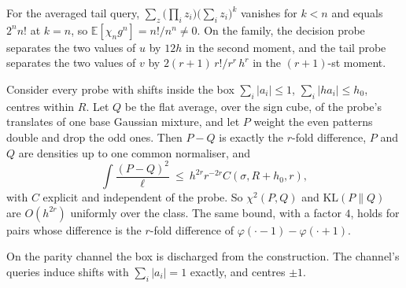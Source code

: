 \begin{theorem}[Attainment]
\label{thm:attain}
For the averaged tail query, $\sum_{z}\bigl(\prod_{i}z_{i}\bigr)\bigl(\sum_{i}z_{i}\bigr)^{k}$
vanishes for $k<n$ and equals $2^{n}n!$ at $k=n$, so $\mathbb{E}[\chi_{n}g^{n}]=n!/n^{n}\ne0$. On
the family, the decision probe separates the two values of $u$ by $12h$ in the second moment,
and the tail probe separates the two values of $v$ by $2(r+1)\,r!/r^{r}\,h^{r}$ in the
$(r+1)$-st moment.
\end{theorem}


\begin{theorem}
\label{thm:unif}
Consider every probe with shifts inside the box $\sum_{i}|a_{i}|\le1$, $\sum_{i}|ha_{i}|\le h_{0}$,
centres within $R$. Let $Q$ be the flat average, over the sign cube, of the probe's translates
of one base Gaussian mixture, and let $P$ weight the even patterns double and drop the odd
ones. Then $P-Q$ is exactly the $r$-fold difference, $P$ and $Q$ are densities up to one common
normaliser, and
\[
\int\frac{(P-Q)^{2}}{\ell}\ \le\ h^{2r}r^{-2r}C(\sigma,R+h_{0},r),
\]
with $C$ explicit and independent of the probe. So $\chi^{2}(P,Q)$ and $\mathrm{KL}(P\|Q)$ are
$O(h^{2r})$ uniformly over the class. The same bound, with a factor $4$, holds for pairs whose
difference is the $r$-fold difference of $\varphi(\cdot-1)-\varphi(\cdot+1)$.
\end{theorem}


On the parity channel the box is discharged from the construction. The channel's queries
induce shifts with $\sum_{i}|a_{i}|=1$ exactly, and centres $\pm1$.


